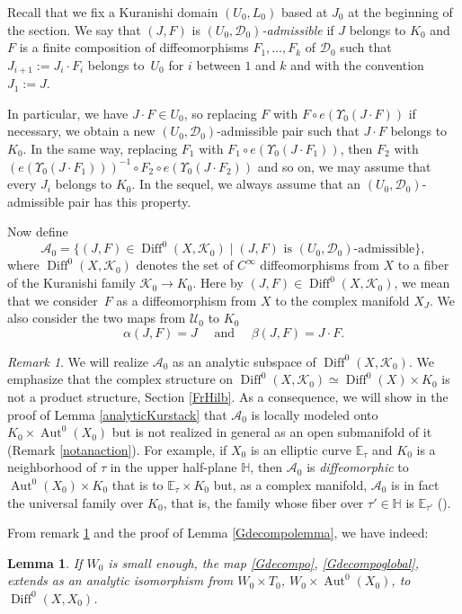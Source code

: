 \documentclass[10pt]{amsart}
\let\mathcal\mathscr
\DeclareMathOperator{\Aut}{Aut}
\DeclareMathOperator{\Diff}{Diff}
\theoremstyle{plain}
\newtheorem{lemma}[theorem]{Lemma}
\theoremstyle{definition}
\theoremstyle{remark}
\newtheorem{remark}[theorem]{Remark}
\numberwithin{equation}{section}
\newcommand{\Azero}{\Aut^0(X_0)}
\newcommand{\D}{\Diff^0(X)}
\begin{document}
Recall that we fix a Kuranishi domain $(U_0,L_0)$ based at $J_0$ at the beginning of the section. We say that $(J,F)$ is \emph{$(U_0,\mathcal D_0)$-admissible} if $J$ belongs to $K_0$ and $F$ is a finite composition of diffeomorphisms $F_1,\hdots, F_k$ of $\mathcal D_0$ such that $J_{i+1}:=J_i\cdot F_i$ belongs to~$U_0$ for $i$ between $1$ and $k$ and with the convention $J_1:=J$.

In particular, we have $J\cdot F\in U_0$, so replacing $F$ with $F\circ e(\Upsilon_0(J\cdot F))$ if necessary, we obtain a new $(U_0,\mathcal D_0)$-admissible pair such that $J\cdot F$ belongs to $K_0$. In the same way, replacing $F_1$ with $F_1\circ e(\Upsilon_0(J\cdot F_1))$, then $F_2$ with $(e(\Upsilon_0(J\cdot F_1)))^{-1}\circ F_2\circ e(\Upsilon_0(J\cdot F_2))$ and so on, we may assume that every $J_i$ belongs to $K_0$. In the sequel, we always assume that an $(U_0,\mathcal D_0)$-admissible pair has this property.

Now define
\begin{equation}
\label{Azero}
\mathcal A_0=\{(J,F)\in \Diff^0 (X,\mathcal K_0)\mid (J,F)\text{ is }(U_0,\mathcal D_0)\text{-admissible}\},
\end{equation}
where $\Diff^0 (X,\mathcal K_0)$ denotes the set of $C^\infty$ diffeomorphisms from $X$ to a fiber of the Kuranishi family $\mathcal K_0\to K_0$. Here by $(J,F)\in \Diff^0 (X,\mathcal K_0)$, we mean that we consider~$F$ as a diffeomorphism from $X$ to the complex manifold $X_J$. We also consider the two maps from $\mathcal U_0$ to $K_0$
\begin{equation}
\label{st}
\alpha (J,F)=J\quad\text{ and }\quad \beta (J,F)=J\cdot F.
\end{equation}
\begin{remark}
\label{important}
We will realize $\mathcal A_0$ as an analytic subspace of $\Diff^0 (X,\mathcal K_0)$. We emphasize that the complex structure on $\Diff^0(X,\mathcal K_0)\simeq \D\times K_0$ is not a product structure, \cf Section \ref{FrHilb}. As a consequence, we will show in the proof of Lemma \ref{analyticKurstack} that $\mathcal A_0$ is locally modeled onto $K_0\times\Azero$ but is not realized in general as an open submanifold of it (\cf Remark \ref{notanaction}).
For example, if $X_0$ is an elliptic curve $\mathbb E_\tau$ and $K_0$ is a neighborhood of $\tau$ in the upper half-plane $\mathbb H$, then $\mathcal A_0$ is \emph{diffeomorphic} to $\Azero\times K_0$ that is to $\mathbb E_\tau\times K_0$ but, as a complex manifold, $\mathcal A_0$ is in fact the universal family over $K_0$, that is, the family whose fiber over $\tau'\in\mathbb H$ is $\mathbb E_{\tau'}$ (\cf \cite{Namba}).
\end{remark}
From remark \ref{important} and the proof of Lemma \ref{Gdecompolemma}, we have indeed:
\begin{lemma}
\label{Gdecompolemmaanalytic}
If $W_0$ is small enough, the map \eqref{Gdecompo}, \resp \eqref{Gdecompoglobal}, extends as an analytic isomorphism from $W_0\times T_0$, \resp $W_0\times \Azero$, to $\Diff^0 (X,X_0)$.
\end{lemma}
\end{document}
